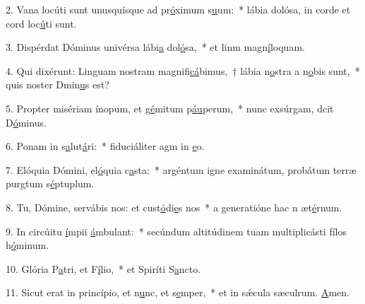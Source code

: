 2. Vana locúti sunt unusquísque ad pr\uline{ó}ximum s\uline{u}um:~* lábia dolósa, in corde et cord loc\uline{ú}ti sunt.\par 
3. Dispérdat Dóminus univérsa lábi\uline{a} dol\uline{ó}sa,~* et linm magn\uline{í}loquam.\par 
4. Qui dixérunt: Linguam nostram magnifi\uline{cá}bimus,~† lábia n\uline{o}stra a n\uline{o}bis sunt,~* quis noster Dmin\uline{u}s est?\par 
5. Propter misériam ínopum, et g\uline{é}mitum p\uline{áu}perum,~* nunc exsúrgam, dcit D\uline{ó}minus.\par 
6. Ponam in s\uline{a}lut\uline{á}ri:~* fiduciáliter agm in \uline{e}o.\par 
7. Elóquia Dómini, el\uline{ó}quia c\uline{a}sta:~* argéntum igne examinátum, probátum terræ purgtum s\uline{é}ptuplum.\par 
8. Tu, Dómine, servábis nos: et cust\uline{ó}di\uline{e}s nos~* a generatióne hac n æt\uline{é}rnum.\par 
9. In circúitu \uline{í}mpii \uline{á}mbulant:~* secúndum altitúdinem tuam multiplicásti fílos h\uline{ó}minum.\par 
10. Glória P\uline{a}tri, et F\uline{í}lio,~* et Spiríti S\uline{a}ncto.\par 
11. Sicut erat in princípio, et n\uline{u}nc, et s\uline{e}mper,~* et in sǽcula sæculrum. \uline{A}men.\par 
